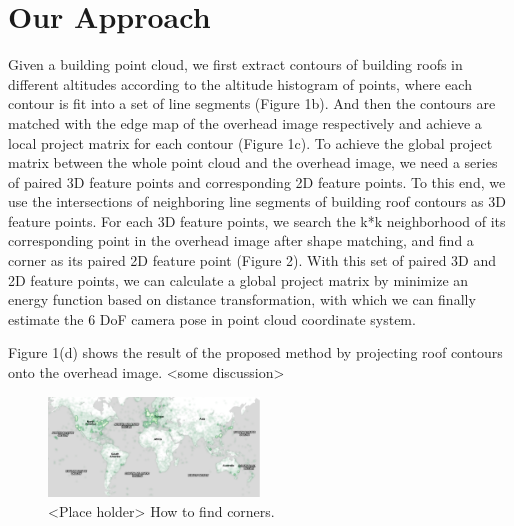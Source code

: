 \documentclass[sigconf,review,anonymous]{acmart}
\begin{document}
\section{Our Approach}
Given a building point cloud, we first extract contours of building roofs in different altitudes according to the altitude histogram of points, where each contour is fit into a set of line segments (Figure 1b). And then the contours are matched with the edge map of the overhead image respectively and achieve a local project matrix for each contour (Figure 1c). To achieve the global project matrix between the whole point cloud and the overhead image, we need a series of paired 3D feature points and corresponding 2D feature points. To this end, we use the intersections of neighboring line segments of building roof contours as 3D feature points. 
For each 3D feature points, we search the k*k neighborhood of its corresponding point in the overhead image after shape matching, and find a corner as its paired 2D feature point (Figure 2).
With this set of paired 3D and 2D feature points, we can calculate a global project matrix by minimize an energy function based on distance transformation, with which we can finally estimate the 6 DoF camera pose in point cloud coordinate system.

Figure 1(d) shows the result of the proposed method by projecting roof contours onto the overhead image. <some discussion>
 \begin{figure}
 	\centering
 	\vspace{2.0cm}
 	\includegraphics[width=0.5\textwidth]{map}
 	\caption{<Place holder> How to find corners.}
 	\label{fig:overview}
 \end{figure}

 
\end{document}
